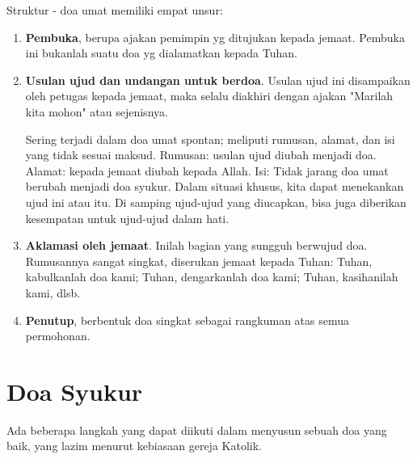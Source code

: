Struktur - doa umat memiliki empat unsur:
\begin{enumerate}
\item \textbf{Pembuka}, berupa ajakan pemimpin yg ditujukan kepada jemaat. Pembuka ini bukanlah suatu doa yg dialamatkan kepada Tuhan.
\item \textbf{Usulan ujud dan undangan untuk berdoa}.
Usulan ujud ini disampaikan oleh petugas kepada jemaat, maka selalu diakhiri dengan ajakan "Marilah kita mohon" atau sejenisnya.

Sering terjadi dalam doa umat spontan; meliputi rumusan, alamat, dan isi yang tidak sesuai maksud. Rumusan: usulan ujud diubah menjadi doa. Alamat: kepada jemaat diubah kepada Allah. Isi: Tidak jarang doa umat berubah menjadi doa syukur.
Dalam situasi khusus, kita dapat menekankan ujud ini atau itu. Di samping ujud-ujud yang diucapkan, bisa juga diberikan kesempatan untuk ujud-ujud dalam hati.

\item \textbf{Aklamasi oleh jemaat}.
Inilah bagian yang sungguh berwujud doa. Rumusannya sangat singkat, diserukan jemaat kepada Tuhan: Tuhan, kabulkanlah doa kami; Tuhan, dengarkanlah doa kami; Tuhan, kasihanilah kami, dlsb.
\item \textbf{Penutup}, berbentuk doa singkat sebagai rangkuman atas semua permohonan.
\end{enumerate}

\section{Doa Syukur}
Ada beberapa langkah yang dapat diikuti dalam menyusun sebuah doa yang baik, yang lazim menurut kebiasaan gereja Katolik.

